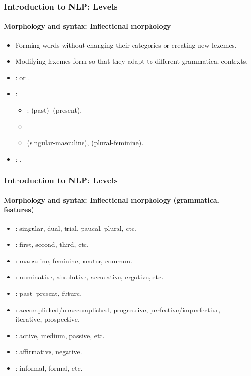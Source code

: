 \documentclass[xcolor=table]{beamer}
\begin{document}
\begin{frame}
\frametitle{Introduction to NLP: Levels}
\framesubtitle{Morphology and syntax: Inflectional morphology}


\begin{itemize}
	\item Forming words without changing their categories or creating new lexemes.
	\item Modifying lexemes form so that they adapt to different grammatical contexts.
	\item {}:  or .
	\item {}:
	\begin{itemize}
		\item {}:  (past),  (present).
		\item {}
		\item {}  (singular-masculine),  (plural-feminine).
	\end{itemize}
	\item {}: .
	
\end{itemize}
\end{frame}

\begin{frame}
\frametitle{Introduction to NLP: Levels}
\framesubtitle{Morphology and syntax: Inflectional morphology (grammatical features)}

\begin{itemize}
	\item {}: singular, dual, trial, paucal, plural, etc. 
	\item {}: first, second, third, etc.
	\item {}: masculine, feminine, neuter, common.
	\item {}: nominative, absolutive, accusative, ergative, etc.
	\item {}: past, present, future.
	\item {}: accomplished/unaccomplished, progressive, perfective/imperfective, iterative, prospective.
	\item {}: active, medium, passive, etc.
	\item {}: affirmative, negative.
	\item {}: informal, formal, etc.
\end{itemize}

\end{frame}
\end{document}

